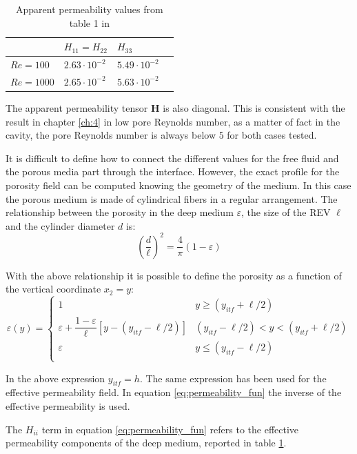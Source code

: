 \begin{table}[h]
	\centering
	\begin{tabular}{ l | l |  l   l   }
		& $H_{11} = H_{22}$ & $H_{33}$ \\ 
		\hline
		\hline
		$Re=100$ & $2.63 \cdot 10^{-2}$ & $5.49 \cdot 10^{-2}$ \\ 
		$Re=1000$ & $2.65 \cdot 10^{-2}$ & $5.63 \cdot 10^{-2}$
	\end{tabular}
	\caption{Apparent permeability values from table 1 in \citet{zampogna2016fluid}}
	\label{tab:H}
\end{table}

The apparent permeability tensor $\mathbf{H}$ is also diagonal. This is consistent with the result in chapter \ref{ch:4} in low pore Reynolds number, as a matter of fact in the cavity, the pore Reynolds number is always below $5$ for both cases tested.

It is difficult to define how to connect the different values for the free fluid and the porous media part through the interface.
However, the exact profile for the porosity field can be computed knowing the geometry of the medium. In this case the porous medium is made of cylindrical fibers in a regular arrangement. The relationship between the porosity in the deep medium $\varepsilon$, the size of the REV $\ell$ and the cylinder diameter $d$ is:
$$
\left( \dfrac{d}{\ell} \right)^2 = \dfrac{4}{\pi} \left(1 - \varepsilon \right)
$$

With the above relationship it is possible to define the porosity as a function of the vertical coordinate $x_2 = y$:
\begin{equation}
\varepsilon(y) = 
\begin{cases}
1 & y\geqslant(y_{itf}+\ell/2) \\
\varepsilon +\dfrac{1-\varepsilon}{\ell}\left[y -\left(y_{itf} -\ell/2\right)\right] &  (y_{itf}-\ell/2)<y<(y_{itf}+\ell/2)\\
\varepsilon &y\leqslant(y_{itf}-\ell/2) \\
\end{cases}
\label{eq:porsitity_fun}
\end{equation}

In the above expression $y_{itf} = h$. The same expression has been used for the effective permeability field. In equation \eqref{eq:permeability_fun} the inverse of the effective permeability is used.

The ${H_{ii}}$ term in equation \eqref{eq:permeability_fun} refers to the effective permeability components of the deep medium, reported in table \ref{tab:H}.

